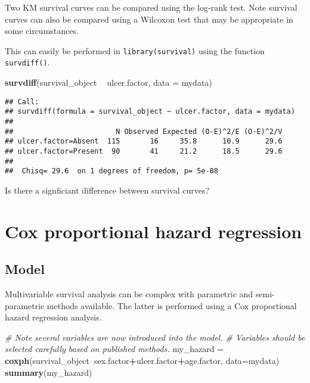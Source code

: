 \documentclass[]{book}
\makeatletter
\newenvironment{Shaded}{\begin{snugshade}}{\end{snugshade}}
\newcommand{\KeywordTok}[1]{\textcolor[rgb]{0.13,0.29,0.53}{\textbf{#1}}}
\newcommand{\DataTypeTok}[1]{\textcolor[rgb]{0.13,0.29,0.53}{#1}}
\newcommand{\StringTok}[1]{\textcolor[rgb]{0.31,0.60,0.02}{#1}}
\newcommand{\CommentTok}[1]{\textcolor[rgb]{0.56,0.35,0.01}{\textit{#1}}}
\newcommand{\OperatorTok}[1]{\textcolor[rgb]{0.81,0.36,0.00}{\textbf{#1}}}
\newcommand{\NormalTok}[1]{#1}
\newenvironment{kframe}{%
\medskip{}
\setlength{\fboxsep}{.8em}
 \def\at@end@of@kframe{}%
 \ifinner\ifhmode%
  \def\at@end@of@kframe{\end{minipage}}%
  \begin{minipage}{\columnwidth}%
 \fi\fi%
 \def\FrameCommand##1{\hskip\@totalleftmargin \hskip-\fboxsep
 \colorbox{shadecolor}{##1}\hskip-\fboxsep
     \hskip-\linewidth \hskip-\@totalleftmargin \hskip\columnwidth}%
 \MakeFramed {\advance\hsize-\width
   \@totalleftmargin\z@ \linewidth\hsize
   \@setminipage}}%
 {\par\unskip\endMakeFramed%
 \at@end@of@kframe}
\renewenvironment{Shaded}{\begin{kframe}}{\end{kframe}}
\theoremstyle{definition}
\theoremstyle{definition}
\theoremstyle{definition}
\theoremstyle{remark}
\makeatother
\begin{document}
Two KM survival curves can be compared using the log-rank test. Note
survival curves can also be compared using a Wilcoxon test that may be
appropriate in some circumstances.

This can easily be performed in \texttt{library(survival)} using the
function \texttt{survdiff()}.

\begin{Shaded}
\begin{Highlighting}[]
\KeywordTok{survdiff}\NormalTok{(survival_object }\OperatorTok{~}\StringTok{ }\NormalTok{ulcer.factor, }\DataTypeTok{data =}\NormalTok{ mydata)}
\end{Highlighting}
\end{Shaded}

\begin{verbatim}
## Call:
## survdiff(formula = survival_object ~ ulcer.factor, data = mydata)
## 
##                        N Observed Expected (O-E)^2/E (O-E)^2/V
## ulcer.factor=Absent  115       16     35.8      10.9      29.6
## ulcer.factor=Present  90       41     21.2      18.5      29.6
## 
##  Chisq= 29.6  on 1 degrees of freedom, p= 5e-08
\end{verbatim}

Is there a signficiant difference between survival curves?

\section{Cox proportional hazard
regression}\label{cox-proportional-hazard-regression}

\subsection{Model}\label{model-1}

Multivariable survival analysis can be complex with parametric and
semi-parametric methods available. The latter is performed using a Cox
proportional hazard regression analysis.

\begin{Shaded}
\begin{Highlighting}[]
\CommentTok{# Note several variables are now introduced into the model. }
\CommentTok{# Variables should be selected carefully based on published methods.  }
\NormalTok{my_hazard =}\StringTok{ }\KeywordTok{coxph}\NormalTok{(survival_object}\OperatorTok{~}\NormalTok{sex.factor}\OperatorTok{+}\NormalTok{ulcer.factor}\OperatorTok{+}\NormalTok{age.factor, }\DataTypeTok{data=}\NormalTok{mydata)}
\KeywordTok{summary}\NormalTok{(my_hazard)}
\end{Highlighting}
\end{Shaded}
\end{document}

